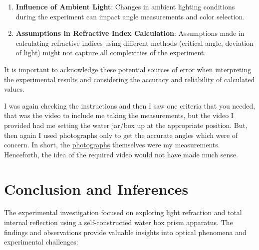 \documentclass[twocolumn,11pt]{article}
\begin{document}
\begin{enumerate}
    \item \textbf{Influence of Ambient Light}: Changes in ambient lighting conditions during the experiment can impact angle measurements and color selection.

    \item \textbf{Assumptions in Refractive Index Calculation}: Assumptions made in calculating refractive indices using different methods (critical angle, deviation of light) might not capture all complexities of the experiment.

\end{enumerate}

It is important to acknowledge these potential sources of error when interpreting the experimental results and considering the accuracy and reliability of calculated values.
\begin{tcolorbox}[width=8cm,colback={aqua},title={Note From The Author},colbacktitle=white,coltitle=black]    
    I was again checking the instructions and then I saw one criteria that you needed, that was the video to include me taking the measurements, but the video I provided had me setting the water jar/box up at the appropriate position. But, then again I used photographs only to get the accurate angles which were of concern. In short, the \href{https://drive.google.com/drive/folders/1HpE8DsCllbn2vvjRN1D8Pb3C0fbAIA9V?usp=sharing}{photographs} themselves were my measurements. Henceforth, the idea of the required video would not have made much sense.  
\end{tcolorbox}

\section{Conclusion and Inferences}
The experimental investigation focused on exploring light refraction and total internal reflection using a self-constructed water box prism apparatus. The findings and observations provide valuable insights into optical phenomena and experimental challenges:
\end{document}
